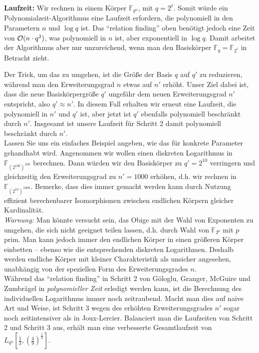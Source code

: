 \begin{refsegment}
\textbf{Laufzeit:} Wir rechnen in einem Körper $\mathbb{F}_{q^n}$, mit $q=2^{\ell}$. Somit würde ein Polynomialzeit-Algorithmus eine Laufzeit erfordern, die polynomiell in den Parametern $n$ und $\log q$ ist. Das "`relation finding"' oben benötigt jedoch eine Zeit von ${\cal O}(n \cdot q^2)$, was polynomiell in $n$ ist, aber exponentiell in $\log q$. Damit arbeitet der Algorithmus aber nur unzureichend, wenn man den Basiskörper $\mathbb{F}_q = \mathbb{F}_{2^{\ell}}$ in Betracht zieht.

Der Trick, um das zu umgehen, ist die Größe der Basis $q$ auf $q'$ zu reduzieren, während man den Erweiterungsgrad $n$ etwas auf $n'$ erhöht. Unser Ziel dabei ist, dass die neue Basiskörpergröße $q'$ ungefähr dem neuen Erweiterungsgrad $n'$ entspricht, also $q' \approx n'$. In diesem Fall erhalten wir erneut eine Laufzeit, die polynomiell in $n'$ und $q'$ ist, aber jetzt ist $q'$ ebenfalls polynomiell beschränkt durch $n'$. Insgesamt ist unsere Laufzeit für Schritt 2 damit polynomiell beschränkt durch $n'$.\\[0.1cm]

Lassen Sie uns ein einfaches Beispiel angeben, wie das für konkrete Parameter gehandhabt wird. Angenommen wir wollen einen diskreten Logarithmus in $\mathbb{F}_{(2^{100})^{100}}$ berechnen. Dann würden wir den Basiskörper zu $q'=2^{10}$ verringern und gleichzeitig den Erweiterungsgrad zu $n'=1000$ erhöhen, d.h. wir rechnen in $\mathbb{F}_{(2^{10})^{1000}}$. Bemerke, dass dies immer gemacht werden kann durch Nutzung effizient berechenbarer Isomorphismen zwischen endlichen Körpern gleicher Kardinalität.\\[0.1cm]

{\em Warnung:} Man könnte versucht sein, das Obige mit der Wahl von Exponenten zu umgehen, die sich nicht geeignet teilen lassen, d.h. durch Wahl von $\mathbb{F}_{2^p}$ mit $p$ prim. Man kann jedoch immer den endlichen Körper in einen größeren Körper einbetten -- ebenso wie die entsprechenden diskreten Logarithmen. Deshalb werden endliche Körper mit kleiner Charakteristik als unsicher angesehen, unabhängig von der speziellen Form des Erweiterungsgrades $n$.\\[0.1cm]

Während das "`relation finding"' in Schritt 2 von G\"ologlu, Granger, McGuire und Zumbr\"agel in {\em polynomieller Zeit} erledigt werden kann, ist die Berechnung des individuellen Logarithmus immer noch zeitraubend. Macht man dies auf naive Art und Weise, ist Schritt 3 wegen des erhöhten Erweiterungsgrades $n'$ sogar noch zeitintensiver als in Joux-Lercier. Balanciert man die Laufzeiten von Schritt 2 und Schritt 3 aus, erhält man eine verbesserte Gesamtlaufzeit von $L_{q^n}[\frac 1 3, (\frac 4 9)^{\frac 1 3}]$.



\end{refsegment}
